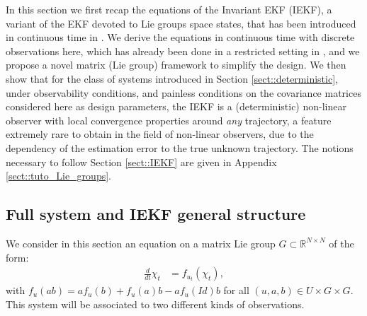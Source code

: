 \documentclass[a4paper,12pt,onecolumn]{article}
\newcommand{\RR}{{\mathbb{R}}}
\begin{document}
In this section we first recap the equations of the Invariant EKF (IEKF), a variant of the EKF devoted to Lie groups space states, that has been introduced in continuous time in \cite{bonnabel2007left,bonnabel2009invariant}. We derive the equations in continuous time with discrete observations here, which has already been done in a restricted setting in \cite{barrau2013intrinsic}, and we propose a novel matrix (Lie group) framework to simplify the design. We then show that for the class of systems introduced in Section \ref{sect::deterministic}, under observability conditions, and painless conditions on the covariance matrices considered here as design parameters, the IEKF is a (deterministic) non-linear observer with local convergence properties around \emph{any} trajectory, a feature extremely rare to obtain in the field of non-linear observers, due to the dependency of the estimation error to the true unknown trajectory. The notions necessary to follow Section \ref{sect::IEKF} are given in Appendix \ref{sect::tuto_Lie_groups}. 

\subsection{Full system and IEKF general structure}


We consider in this section an equation on a matrix Lie group $G\subset \RR^{N\times N}$ of the form:
\begin{align}
\frac{d}{dt}\chi_t & = f_{u_t}(\chi_t), \label{eq::IEKF_modelle}
\end{align}
with $
f_u(ab)=af_u(b)+f_u(a)b-af_u(Id)b$ for all $(u,a,b)\in U\times G\times G$. This system will be associated to two different kinds of observations.
\end{document}
